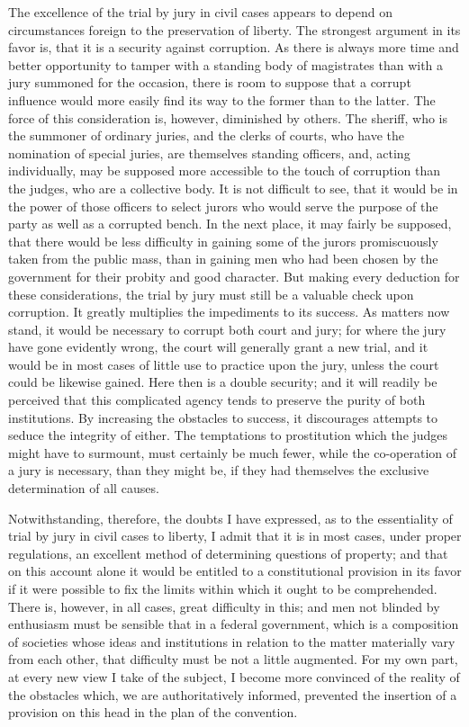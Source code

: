 The excellence of the trial by jury in civil cases appears to depend on circumstances foreign to the preservation of liberty. 
The strongest argument in its favor is, that it is a security against corruption. 
As there is always more time and better opportunity to tamper with a standing body of magistrates than with a jury summoned for the occasion, there is room to suppose that a corrupt influence would more easily find its way to the former than to the latter. 
The force of this consideration is, however, diminished by others. 
The sheriff, who is the summoner of ordinary juries, and the clerks of courts, who have the nomination of special juries, are themselves standing officers, and, acting individually, may be supposed more accessible to the touch of corruption than the judges, who are a collective body. 
It is not difficult to see, that it would be in the power of those officers to select jurors who would serve the purpose of the party as well as a corrupted bench. 
In the next place, it may fairly be supposed, that there would be less difficulty in gaining some of the jurors promiscuously taken from the public mass, than in gaining men who had been chosen by the government for their probity and good character. 
But making every deduction for these considerations, the trial by jury must still be a valuable check upon corruption. 
It greatly multiplies the impediments to its success. 
As matters now stand, it would be necessary to corrupt both court and jury; for where the jury have gone evidently wrong, the court will generally grant a new trial, and it would be in most cases of little use to practice upon the jury, unless the court could be likewise gained. 
Here then is a double security; and it will readily be perceived that this complicated agency tends to preserve the purity of both institutions. 
By increasing the obstacles to success, it discourages attempts to seduce the integrity of either. 
The temptations to prostitution which the judges might have to surmount, must certainly be much fewer, while the co-operation of a jury is necessary, than they might be, if they had themselves the exclusive determination of all causes.

Notwithstanding, therefore, the doubts I have expressed, as to the essentiality of trial by jury in civil cases to liberty, I admit that it is in most cases, under proper regulations, an excellent method of determining questions of property; and that on this account alone it would be entitled to a constitutional provision in its favor if it were possible to fix the limits within which it ought to be comprehended. 
There is, however, in all cases, great difficulty in this; and men not blinded by enthusiasm must be sensible that in a federal government, which is a composition of societies whose ideas and institutions in relation to the matter materially vary from each other, that difficulty must be not a little augmented. 
For my own part, at every new view I take of the subject, I become more convinced of the reality of the obstacles which, we are authoritatively informed, prevented the insertion of a provision on this head in the plan of the convention.

